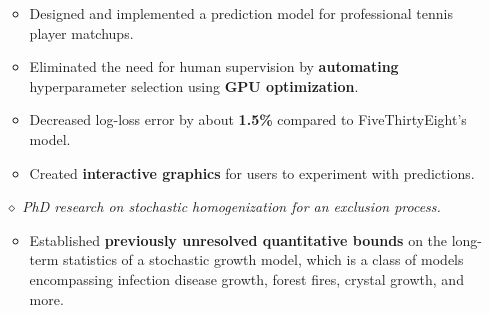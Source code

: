 \documentclass{simplecv}
\begin{document}
\begin{itemize}
  \begin{itemize}
    \item Designed and implemented a prediction model for professional tennis player matchups.
    \item Eliminated the need for human supervision by {\bf automating} hyperparameter selection using {\bf GPU optimization}.
    \item Decreased log-loss error by about {\bf 1.5\%} compared to FiveThirtyEight's model.
    \item Created {\bf interactive graphics} for users to experiment with predictions.
  \end{itemize}
  \item[$\diamond$] {\it PhD research on stochastic homogenization for an exclusion process.}  
  \begin{itemize}
    \item Established {\bf previously unresolved quantitative bounds} on the long-term statistics of a stochastic growth model, which is a class of models encompassing infection disease growth, forest fires, crystal growth, and more. 

\end{itemize}
\end{itemize}
\end{document}
